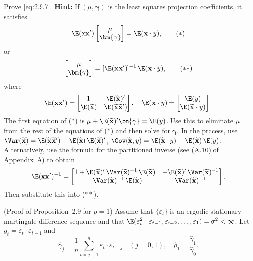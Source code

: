 \begin{problemset}
\exercise[8] Prove \eqref{eq:2.9.7}. \textbf{Hint:} If $(\mu, \bm{\gamma})$ is the least squares projection
coefficients, it satisfies
\[
\E(\mathbf{x}\mathbf{x}')
\begin{bmatrix} \mu \\ \bm{\gamma} \end{bmatrix}
= \E(\mathbf{x} \cdot y),
\tag{$*$}
\]
or
\[
\begin{bmatrix} \mu \\ \bm{\gamma} \end{bmatrix}
= [\E(\mathbf{x}\mathbf{x}')]^{-1}\,\E(\mathbf{x} \cdot y),
\tag{$**$}
\]
where
\[
\E(\mathbf{x}\mathbf{x}') = \begin{bmatrix}
1 & \E(\widetilde{\mathbf{x}})' \\
\E(\widetilde{\mathbf{x}}) & \E(\widetilde{\mathbf{x}}\widetilde{\mathbf{x}}')
\end{bmatrix}, \quad
\E(\mathbf{x} \cdot y) = \begin{bmatrix}
\E(y) \\ \E(\widetilde{\mathbf{x}} \cdot y)
\end{bmatrix}.
\]
The first equation of ($*$) is
$\mu + \E(\widetilde{\mathbf{x}})'\bm{\gamma} = \E(y)$. Use this to eliminate $\mu$ from the
rest of the equations of ($*$) and then solve for $\bm{\gamma}$. In the process, use
$\Var(\widetilde{\mathbf{x}}) = \E(\widetilde{\mathbf{x}}\widetilde{\mathbf{x}}') - \E(\widetilde{\mathbf{x}})\,\E(\widetilde{\mathbf{x}})'$,
$\Cov(\widetilde{\mathbf{x}}, y) = \E(\widetilde{\mathbf{x}} \cdot y) - \E(\widetilde{\mathbf{x}})\,\E(y)$.
Alternatively, use the formula for the partitioned inverse (see (A.10) of Appendix~A) to obtain
\[
\E(\mathbf{x}\mathbf{x}')^{-1} = \begin{bmatrix}
1 + \E(\widetilde{\mathbf{x}})'\,\Var(\widetilde{\mathbf{x}})^{-1}\,\E(\widetilde{\mathbf{x}})
& -\E(\widetilde{\mathbf{x}})'\,\Var(\widetilde{\mathbf{x}})^{-1} \\
-\Var(\widetilde{\mathbf{x}})^{-1}\,\E(\widetilde{\mathbf{x}})
& \Var(\widetilde{\mathbf{x}})^{-1}
\end{bmatrix}.
\]
Then substitute this into ($**$).

\exercise[9] (Proof of Proposition~2.9 for $p = 1$)\quad
Assume that $\{\varepsilon_t\}$ is an ergodic stationary
martingale difference sequence and that
$\E(\varepsilon_t^2 \mid \varepsilon_{t-1}, \varepsilon_{t-2}, \ldots, \varepsilon_1) = \sigma^2 < \infty$.
Let $g_t = \varepsilon_t \cdot \varepsilon_{t-1}$ and
\[
\hat{\gamma}_j = \frac{1}{n}\sum_{t=j+1}^{n}\varepsilon_t \cdot \varepsilon_{t-j}
\quad (j = 0, 1), \quad
\hat{\rho}_1 = \frac{\hat{\gamma}_1}{\hat{\gamma}_0}.
\]


\end{problemset}
